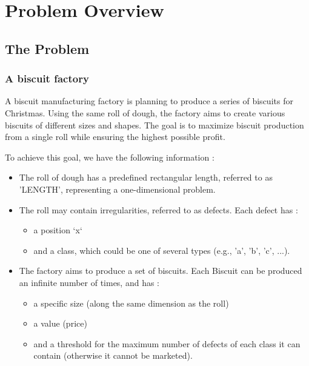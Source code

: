 \documentclass{modeleRapport}
\begin{document}
\fairepagedegarde
\fairetabledesmatieres


\section{Problem Overview}

\subsection{The Problem}

\subsubsection{A biscuit factory}

A biscuit manufacturing factory is planning to produce a series of biscuits for Christmas. Using the same roll of dough, 
the factory aims to create various biscuits of different sizes and shapes. The goal is to maximize biscuit production from a 
single roll while ensuring the highest possible profit.

To achieve this goal, we have the following information :

\begin{itemize}
    \item The roll of dough has a predefined rectangular length, referred to as ’LENGTH’, representing a one-dimensional problem.
    
    \item The roll may contain irregularities, referred to as defects. Each defect has :
    \begin{itemize}
        \item a position ‘x‘
        \item and a class, which could be one of several types (e.g., ’a’, ’b’, ’c’, ...).
    \end{itemize}

    \item The factory aims to produce a set of biscuits. Each Biscuit can be produced an infinite number of times, and has :
    \begin{itemize}
        \item a specific size (along the same dimension as the roll)
        \item a value (price)
        \item and a threshold for the maximum number of defects of each class it can contain (otherwise it cannot be marketed).
    \end{itemize}
\end{itemize}
\end{document}
